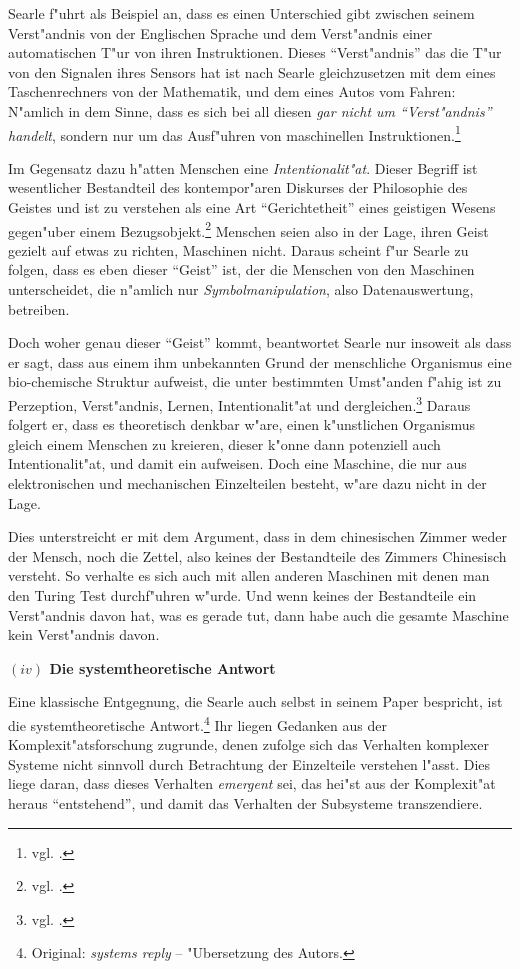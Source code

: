 \documentclass[a4paper, emulatestandardclasses, 12pt]{scrartcl}
\begin{document}
\begin{onehalfspace}
Searle f"uhrt als Beispiel an, dass es einen Unterschied gibt zwischen seinem Verst"andnis von der Englischen Sprache und dem Verst"andnis einer automatischen T"ur von ihren Instruktionen. Dieses "`Verst"andnis"' das die T"ur von den Signalen ihres Sensors hat ist nach Searle gleichzusetzen mit dem eines Taschenrechners von der Mathematik, und dem eines Autos vom Fahren: N"amlich in dem Sinne, dass es sich bei all diesen \emph{gar nicht um "`Verst"andnis"' handelt}, sondern nur um das Ausf"uhren von maschinellen Instruktionen.\footnote{vgl. \cite[S.????]{searle1980minds}.}

Im Gegensatz dazu h"atten Menschen eine \emph{Intentionalit"at}. Dieser Begriff ist wesentlicher Bestandteil des kontempor"aren Diskurses der Philosophie des Geistes und ist zu verstehen als eine Art "`Gerichtetheit"' eines geistigen Wesens gegen"uber einem Bezugsobjekt.\footnote{vgl. \cite{sep-intentionality}.} Menschen seien also in der Lage, ihren Geist gezielt auf etwas zu richten, Maschinen nicht. Daraus scheint f"ur Searle zu folgen, dass es eben dieser "`Geist"' ist, der die Menschen von den Maschinen unterscheidet, die n"amlich nur \emph{Symbolmanipulation}, also Datenauswertung, betreiben. 

Doch woher genau dieser "`Geist"' kommt, beantwortet Searle nur insoweit als dass er sagt, dass aus einem ihm unbekannten Grund der menschliche Organismus eine bio-chemische Struktur aufweist, die unter bestimmten Umst"anden f"ahig ist zu Perzeption, Verst"andnis, Lernen, Intentionalit"at und dergleichen.\footnote{vgl. \cite[S.????]{searle1980minds}.} Daraus folgert er, dass es theoretisch denkbar w"are, einen k"unstlichen Organismus gleich einem Menschen zu kreieren, dieser k"onne dann potenziell auch Intentionalit"at, und damit ein  aufweisen. Doch eine Maschine, die nur aus elektronischen und mechanischen Einzelteilen besteht, w"are dazu nicht in der Lage. 

Dies unterstreicht er mit dem Argument, dass in dem chinesischen Zimmer weder der Mensch, noch die Zettel, also keines der Bestandteile des Zimmers Chinesisch versteht. So verhalte es sich auch mit allen anderen Maschinen mit denen man den Turing Test durchf"uhren w"urde. Und wenn keines der Bestandteile ein Verst"andnis davon hat, was es gerade tut, dann habe auch die gesamte Maschine kein Verst"andnis davon.

\vspace{5mm}
\noindent\textbf{$(iv)$ Die systemtheoretische Antwort}

\noindent Eine klassische Entgegnung, die Searle auch selbst in seinem Paper bespricht, ist die systemtheoretische Antwort.\footnote{Original: \emph{systems reply} --  "Ubersetzung des Autors.} Ihr liegen Gedanken aus der Komplexit"atsforschung zugrunde, denen zufolge sich das Verhalten komplexer Systeme nicht sinnvoll durch Betrachtung der Einzelteile verstehen l"asst. Dies liege daran, dass dieses Verhalten \emph{emergent} sei, das hei"st aus der Komplexit"at heraus "`entstehend"', und damit das Verhalten der Subsysteme transzendiere. 


\end{onehalfspace}
\end{document}
